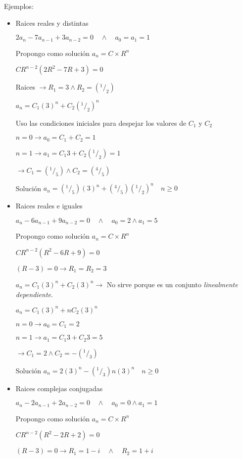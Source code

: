 \documentclass[a4paper, twoside]{article}
\begin{document}
Ejemplos:
\begin{itemize}
	\item Raices reales y distintas
	
	$2a_n - 7 a_{n-1} + 3 a_{n-2} = 0 \quad \wedge \quad a_0 = a_1 = 1$
	
	Propongo como solución $a_n = C \times R^n$
	
	$C R^{n-2} \left(2R^2 - 7R + 3 \right) = 0$

	Raices $\rightarrow R_1 = 3 \wedge R_2 = (^1/_2)$
	
	$a_n = C_1 (3)^n + C_2 (^1/_2)^n$ 
	
	Uso las condiciones iniciales para despejar los valores de $C_1$ y $C_2$
	
	$n=0 \rightarrow a_0 = C_1+C_2 = 1$
	
	$n=1 \rightarrow a_1 = C_1 3+C_2 (^1/_2) = 1$
	
	$\rightarrow C_1 = (^1/_5) \wedge C_2 = (^4/_5)$
	
	Solución $a_n = (^1/_5)(3)^n + (^4/_5)(^1/_2)^n \quad n \geq 0$
	
	\item Raices reales e iguales
	
	$a_n - 6 a_{n-1} + 9 a_{n-2} = 0 \quad \wedge \quad a_0 = 2 \wedge a_1 = 5$
	
	Propongo como solución $a_n = C \times R^n$
	
	$C R^{n-2} \left(R^2 - 6R + 9 \right) = 0$
	
	$\left(R - 3 \right) = 0 \rightarrow R_1=R_2=3$
	
	$a_n= C_1 (3)^n + C_2 (3)^n \rightarrow$ No sirve porque es un conjunto \emph{linealmente dependiente}.
	
	$a_n = C_1 (3)^n + n C_2 (3)^n$
	
	$n=0 \rightarrow a_0 = C_1 = 2$
	
	$n=1 \rightarrow a_1 = C_1 3+C_2 3 = 5$
	
	$\rightarrow C_1 = 2 \wedge C_2 =- (^1/_3)$
	
	Solución $a_n = 2(3)^n - (^1/_3)n(3)^n \quad n \geq 0$
	
	\item Raices complejas conjugadas
	
	$a_n - 2 a_{n-1} + 2 a_{n-2} = 0 \quad \wedge \quad a_0 = 0 \wedge a_1 = 1$
	
	Propongo como solución $a_n = C \times R^n$
	
	$C R^{n-2} \left(R^2 - 2 R + 2 \right) = 0$
	
	$\left(R - 3 \right) = 0 \rightarrow R_1=1-i \quad \wedge \quad R_2 =1+i$
	

\end{itemize}
\end{document}
